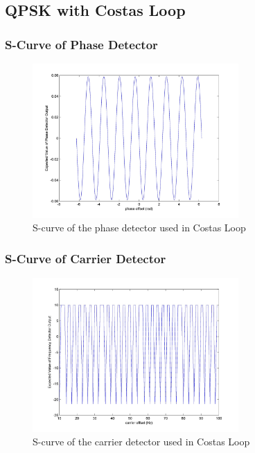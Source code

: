 \documentclass[]{article}
\begin{document}
\subsection{QPSK with Costas Loop}

\subsubsection{S-Curve of Phase Detector}
\begin{figure}[H]
\centering
\hspace*{-2cm}\includegraphics[width=0.7\textwidth]{qpScurvepo_costas.jpg}
\caption{S-curve of the phase detector used in Costas Loop}
\end{figure}
\subsubsection{S-Curve of Carrier Detector}
\begin{figure}[H]
\centering
\hspace*{-2cm}\includegraphics[width=0.7\textwidth]{qpScurvefo.jpg}
\caption{S-curve of the carrier detector used in Costas Loop}
\end{figure}
\end{document}

